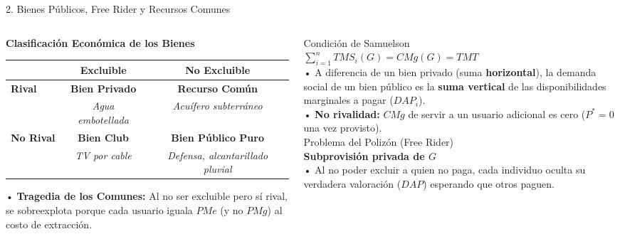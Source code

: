 \documentclass[aspectratio=169, 10pt]{beamer}
\begin{document}
\begin{frame}{2. Bienes Públicos, Free Rider y Recursos Comunes}
  \vspace{0.1cm}
  \begin{columns}[T]
    \begin{column}{0.52\textwidth}
      {\small\textbf{Clasificación Económica de los Bienes}}
      \vspace{0.15cm}
      \renewcommand{\arraystretch}{1.45}
      {\scriptsize
      \begin{tabular}{@{}lcc@{}}
        \toprule
        & \textbf{Excluible} & \textbf{No Excluible} \\
        \midrule
        \textbf{Rival} & \textbf{Bien Privado} & \textbf{Recurso Común} \\
        & \textit{Agua embotellada} & \textit{Acuífero subterráneo} \\
        \midrule
        \textbf{No Rival} & \textbf{Bien Club} & \textbf{Bien Público Puro} \\
        & \textit{TV por cable} & \textit{Defensa, alcantarillado pluvial} \\
        \bottomrule
      \end{tabular}
      }
      \vspace{0.15cm}
      {\scriptsize
        • \textbf{Tragedia de los Comunes:} Al no ser excluible pero sí rival, se sobreexplota porque cada usuario iguala \(PMe\) (y no \(PMg\)) al costo de extracción.
      }
    \end{column}

    \begin{column}{0.45\textwidth}
      {\scriptsize\color{grisTexto}Condición de Samuelson}\\[1pt]
      {\large\color{azulPrincipal}\textbf{\(\sum_{i=1}^n TMS_i(G) = CMg(G) = TMT\)}}\\[4pt]
      {\scriptsize
        • A diferencia de un bien privado (suma \textbf{horizontal}), la demanda social de un bien público es la \textbf{suma vertical} de las disponibilidades marginales a pagar (\(DAP_i\)).\\
        • \textbf{No rivalidad:} \(CMg\) de servir a un usuario adicional es cero (\(P^*=0\) una vez provisto).\\[4pt]
      }
      {\scriptsize\color{grisTexto}Problema del Polizón (Free Rider)}\\[1pt]
      {\large\color{rojoAcento}\textbf{Subprovisión privada de \(G\)}}\\[4pt]
      {\scriptsize
        • Al no poder excluir a quien no paga, cada individuo oculta su verdadera valoración (\(DAP\)) esperando que otros paguen.
      }
    \end{column}
  \end{columns}

\end{frame}
\end{document}
